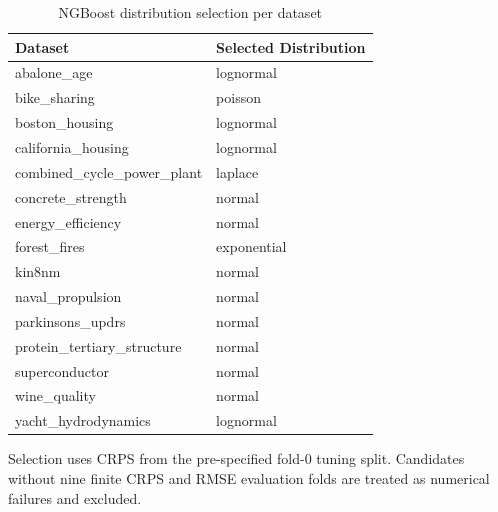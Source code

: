 \begin{table}[htbp]
\centering
\caption{NGBoost distribution selection per dataset}
\label{tab:ngboost-selection}
\begin{tabular}{ll}
\toprule
Dataset & Selected Distribution \\
\midrule
abalone\_age & lognormal \\
bike\_sharing & poisson \\
boston\_housing & lognormal \\
california\_housing & lognormal \\
combined\_cycle\_power\_plant & laplace \\
concrete\_strength & normal \\
energy\_efficiency & normal \\
forest\_fires & exponential \\
kin8nm & normal \\
naval\_propulsion & normal \\
parkinsons\_updrs & normal \\
protein\_tertiary\_structure & normal \\
superconductor & normal \\
wine\_quality & normal \\
yacht\_hydrodynamics & lognormal \\
\bottomrule
\end{tabular}
\par\smallskip\footnotesize{Selection uses CRPS from the pre-specified fold-0 tuning split. Candidates without nine finite CRPS and RMSE evaluation folds are treated as numerical failures and excluded.}
\end{table}
